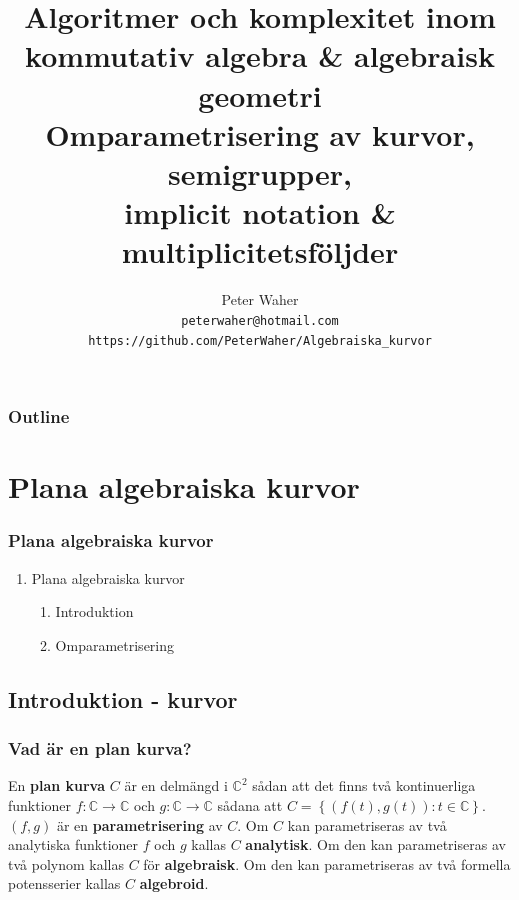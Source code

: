 \documentclass{beamer}
\title[Algoritmer och komplexitet inom algebraisk geometri]{
	Algoritmer och komplexitet inom \\
	kommutativ algebra \& algebraisk geometri \\[20pt]
	\large Omparametrisering av kurvor, semigrupper, \\
	implicit notation \& multiplicitetsföljder}
\author[Peter Waher]{Peter Waher \\[10pt]
	\texttt{peterwaher@hotmail.com}\\
	\texttt{https://github.com/PeterWaher/Algebraiska\_kurvor}}
\begin{document}
\begin{frame}
	\titlepage
\end{frame}

\begin{frame}
	\frametitle{Outline}
	\tableofcontents[pausesections]
\end{frame}





\section{Plana algebraiska kurvor}

\begin{frame}
	\frametitle{Plana algebraiska kurvor}
	\begin{enumerate}
		\item<1-> Plana algebraiska kurvor
		\begin{enumerate}
			\item<2-> Introduktion
			\item<3-> Omparametrisering
		\end{enumerate}
	\end{enumerate}
\end{frame}

\subsection{Introduktion - kurvor}

\begin{frame}
\frametitle{Vad är en plan kurva?}
\begin{Definition}
	En \textbf{plan kurva} $C$ är en delmängd i $\mathbb{C}^2$ sådan att det finns två kontinuerliga funktioner $f : \mathbb{C} \rightarrow \mathbb{C}$ och 
	$g : \mathbb{C} \rightarrow \mathbb{C}$ sådana att $C = \left\{\left(f(t), g(t)\right) : t \in \mathbb{C}\right\}$. $(f, g)$ är en \textbf{parametrisering} av $C$. Om $C$ kan parametriseras av två analytiska funktioner $f$ och $g$ kallas $C$ \textbf{analytisk}. Om den kan parametriseras av två polynom kallas $C$ för \textbf{algebraisk}. Om den kan parametriseras av två formella potensserier kallas $C$ \textbf{algebroid}.
\end{Definition}
\end{frame}
\end{document}
